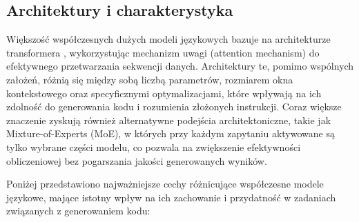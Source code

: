 \subsection{Architektury i charakterystyka}

Większość współczesnych dużych modeli językowych bazuje na architekturze transformera \cite{vaswani_attention_2023}, wykorzystując mechanizm uwagi (attention mechanism) do efektywnego przetwarzania sekwencji danych. Architektury te, pomimo wspólnych założeń, różnią się między sobą liczbą parametrów, rozmiarem okna kontekstowego oraz specyficznymi optymalizacjami, które wpływają na ich zdolność do generowania kodu i rozumienia złożonych instrukcji. Coraz większe znaczenie zyskują również alternatywne podejścia architektoniczne, takie jak Mixture-of-Experts (MoE), w których przy każdym zapytaniu aktywowane są tylko wybrane części modelu, co pozwala na zwiększenie efektywności obliczeniowej bez pogarszania jakości generowanych wyników.

Poniżej przedstawiono najważniejsze cechy różnicujące współczesne modele językowe, mające istotny wpływ na ich zachowanie i przydatność w zadaniach związanych z generowaniem kodu:

